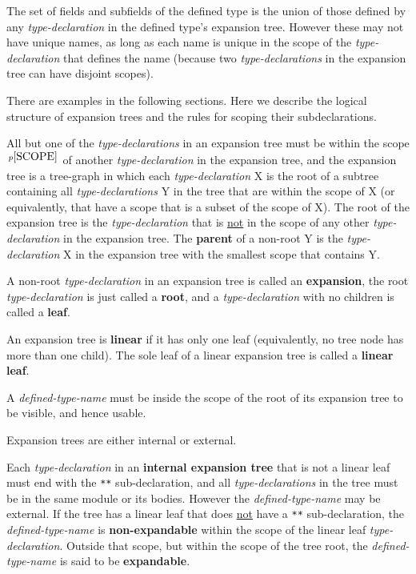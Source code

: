 \documentclass[12pt]{article}
\newcommand{\key}[1]{{\rm \bfseries #1}}
\newcommand{\pagnote}[1]{$\,^{p\pageref{#1}}$}
\begin{document}
The set of fields and subfields of the
defined type is
the union of those defined by any {\em type-declaration} in the defined
type's expansion tree.  However these may not have unique names, as long
as each name is unique in the scope of the {\em type-declaration}
that defines the name (because two {\em type-declarations} in the expansion
tree can have disjoint scopes).

There are examples in the following sections.  Here we describe the
logical structure of expansion trees and the rules for scoping
their subdeclarations.

All but one of the {\em type-declarations} in an expansion tree must be within
the scope\pagnote{SCOPE} of another {\em type-declaration}
in the expansion tree, and
the expansion tree is a tree-graph in which each {\em type-declaration} X is
the root of a subtree containing all {\em type-declarations} Y
in the tree
that are within the scope of X
(or equivalently, that have a scope
that is a subset of the scope of X).  The root of the expansion tree
is the {\em type-declaration} that is \underline{not} in the scope
of any other {\em type-declaration} in the expansion tree.
The \key{parent} of
a non-root Y is the {\em type-declaration} X in the expansion tree
with the smallest scope that contains Y.

A non-root {\em type-declaration} in an expansion tree is called an
\key{expansion}\label{EXPANSION},
the root {\em type-declaration} is just called
a \key{root}\label{ROOT},
and a {\em type-declaration} with no children
is called a \key{leaf}\label{LEAF}.

An expansion
tree is \key{linear} if it has only one leaf (equivalently, no tree node
has more than one child).
The sole leaf of a linear expansion tree is called a \key{linear leaf}.

A {\em defined-type-name} must be inside the scope of the root of its expansion
tree to be visible, and hence usable.

Expansion trees are either internal or external.

Each {\em type-declaration} in an \key{internal expansion tree}
that is not a linear leaf must end with
the {\tt ***}\label{***} sub-declaration, and all {\em type-declarations}
in the tree must be in the same module or its bodies.  However the
{\em defined-type-name} may be external.
If the tree has a linear leaf that does \underline{not}
have a {\tt ***} sub-declaration, the {\em defined-type-name}
is \key{non-expandable}
within the scope of the linear leaf {\em type-declaration}.
Outside that scope, but within the scope of the tree root,
the {\em defined-type-name} is said to be \key{expandable}.
\end{document}
